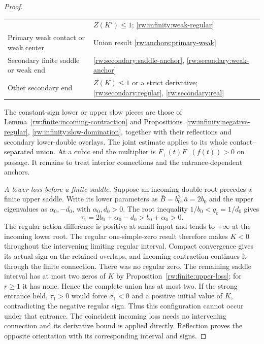 \begin{proof}
\begin{center}
\begin{tabularx}{\linewidth}{@{}p{.42\linewidth}X@{}}
       &$Z(K')\le1$; \ref{rw:infinity:weak-regular}\\
 Primary weak contact or weak center
       &Union result \ref{rw:anchors:primary-weak}\\
 Secondary finite saddle or weak end
       &\ref{rw:secondary:saddle-anchor},
                         \ref{rw:secondary:weak-anchor}\\
 Other secondary end
       &$Z(K)\le1$ or a strict derivative;
                         \ref{rw:secondary:regular},
                         \ref{rw:secondary:real}\\
\bottomrule
\end{tabularx}
\end{center}
The constant-sign lower or upper slow pieces are those of
Lemma~\ref{rw:finite:incoming-contraction} and
Propositions~\ref{rw:infinity:negative-regular},
\ref{rw:infinity:slow-domination}, together with their
reflections and secondary lower-double overlays.
The joint estimate applies to its whole contact--separated union.
At a cubic end the multiplier is $F_+(t)F_-(f(t))>0$ on passage.
It remains to treat interior connections and the entrance-dependent
anchors.

\emph{A lower loss before a finite saddle.}
Suppose an incoming double root precedes a finite upper
saddle. Write its lower parameters as
$\bar B=b_0^2,\bar a=2b_0$ and the upper eigenvalues
as $\alpha_0,-d_0$, with $\alpha_0,d_0>0$.
The root inequality $1/b_0<q_c=1/d_0$ gives
\[
 \tau_1=2b_0+\alpha_0-d_0>b_0+\alpha_0>0 .
\]
The regular action difference is positive at small input
and tends to $+\infty$ at the incoming lower root.
The regular one-simple-zero result therefore makes
$K<0$ throughout the intervening limiting regular
interval. Compact convergence gives its actual sign
on the retained overlaps, and incoming contraction
continues it through the finite connection.
There was no regular zero. The remaining saddle interval
has at most two zeros of $K$ by
Proposition~\ref{rw:finite:upper-loss}; for $r\ge1$
it has none. Hence the complete union has at most two.
If the strong entrance held, $\tau_1>0$ would force
$\sigma_1<0$ and a positive initial value of $K$,
contradicting the negative regular sign.
Thus this configuration cannot occur under that entrance.
The coincident incoming loss needs no intervening
connection and its derivative bound is applied directly.
Reflection proves the opposite orientation with its
corresponding interval and signs.


\end{proof}
